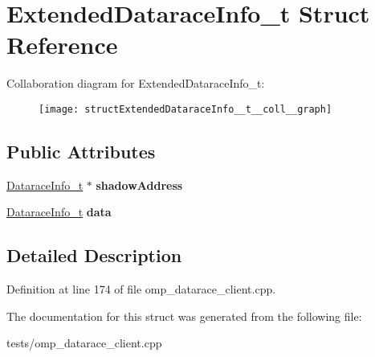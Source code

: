 \hypertarget{structExtendedDataraceInfo__t}{\section{Extended\-Datarace\-Info\-\_\-t Struct Reference}
\label{structExtendedDataraceInfo__t}
}


Collaboration diagram for Extended\-Datarace\-Info\-\_\-t\-:
\nopagebreak
\begin{figure}[H]
\begin{center}
\leavevmode
\texttt{[image: structExtendedDataraceInfo\_\_t\_\_coll\_\_graph]}
\end{center}
\end{figure}
\subsection*{Public Attributes}
\begin{DoxyCompactItemize}
\item 
\hypertarget{structExtendedDataraceInfo__t_a32fc1f93f6fcc1491d1a521dfdb150a6}{\hyperlink{structDataraceInfo__t}{Datarace\-Info\-\_\-t} $\ast$ {\bfseries shadow\-Address}}\label{structExtendedDataraceInfo__t_a32fc1f93f6fcc1491d1a521dfdb150a6}

\item 
\hypertarget{structExtendedDataraceInfo__t_a5fbba0750ba4d2ef0571f9d38a69a874}{\hyperlink{structDataraceInfo__t}{Datarace\-Info\-\_\-t} {\bfseries data}}\label{structExtendedDataraceInfo__t_a5fbba0750ba4d2ef0571f9d38a69a874}

\end{DoxyCompactItemize}


\subsection{Detailed Description}


Definition at line 174 of file omp\-\_\-datarace\-\_\-client.\-cpp.



The documentation for this struct was generated from the following file\-:\begin{DoxyCompactItemize}
\item 
tests/omp\-\_\-datarace\-\_\-client.\-cpp\end{DoxyCompactItemize}
